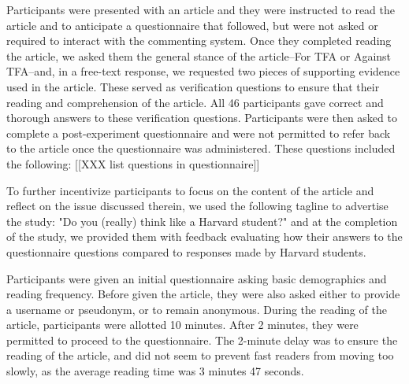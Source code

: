 Participants were presented with an article and they were instructed to read the article and to anticipate a questionnaire that followed, but were not asked or required to interact with the commenting system.  Once they completed reading the article, we asked them the general stance of the article--For TFA or Against TFA--and, in a free-text response, we requested two pieces of supporting evidence used in the article. These served as verification questions to ensure that their reading and comprehension of the article. All 46 participants gave correct and thorough answers to these verification questions. Participants were then asked to complete a post-experiment questionnaire and were not permitted to refer back to the article once the questionnaire was administered. These questions included the following: [[XXX list questions in questionnaire]]

To further incentivize participants to focus on the content of the article and reflect on the issue discussed therein, we used the following tagline to advertise the study: "Do you (really) think like a Harvard student?" and at the completion of the study, we provided them with feedback evaluating how their answers to the questionnaire questions compared to responses made by Harvard students.

%

Participants were given an initial questionnaire asking basic demographics and reading frequency. Before given the article, they were also asked either to provide a username or pseudonym, or to remain anonymous. During the reading of the article, participants were allotted 10 minutes. After 2 minutes, they were permitted to proceed to the questionnaire. The 2-minute delay was to ensure the reading of the article, and did not seem to prevent fast readers from moving too slowly, as the average reading time was 3 minutes 47 seconds. 

